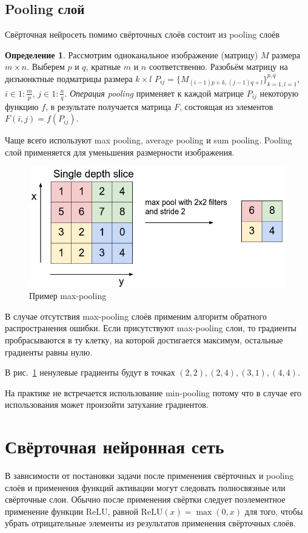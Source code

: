 \documentclass{article}
\theoremstyle{definition}
\newtheorem{definition}{Определение}
\theoremstyle{theorem}
\theoremstyle{remark}
\theoremstyle{theorem}
\theoremstyle{example}
\theoremstyle{theorem}
\theoremstyle{theorem}
\theoremstyle{theorem}
\theoremstyle{theorem}
\begin{document}
	 \subsection{ Pooling слой}
	 	Свёрточная нейросеть помимо свёрточных слоёв состоит из pooling слоёв
	 	\begin{definition}
	 		Рассмотрим одноканальное изображение (матрицу)  $M$ размера $m\times n$. Выберем $p$ и $q$, кратные $m$ и $n$ соответственно. Разобьём матрицу на дизъюнктные подматрицы размера $k\times l$ $P_{ij}=\{M_{(i-1)p+k,(j-1)q+l}\}_{k=1,l=1}^{p,q}$, $i\in1:\frac mp$, $j\in1:\frac nq$. \textit{Операция pooling} применяет к каждой матрице $P_{ij}$ некоторую функцию $f$, в результате получается матрица $F$, состоящая из элементов $F(i,j)=f(P_{ij})$.
	 	\end{definition}
	 	
	 	Чаще всего используют max pooling, average pooling и sum pooling.
	 		Pooling слой применяется для уменьшения размерности изображения.
	 	\begin{figure}[ht!]\label{pool}
	 		\includegraphics[width=\textwidth]{img/maxpool.jpeg}\caption{Пример max-pooling}
	 	\end{figure}
	 В случае отсутствия max-pooling слоёв применим алгоритм обратного распространения ошибки. Если присутствуют max-pooling слои, то градиенты пробрасываются в ту клетку, на которой достигается максимум, остальные градиенты равны нулю.
	
	В рис.~\ref{pool} ненулевые градиенты будут в точках $(2,2), (2,4), (3,1), (4,4)$.
	
	На практике не встречается использование min-pooling потому что в случае его использования может произойти затухание градиентов.
	
	\section{Свёрточная нейронная сеть}
		В зависимости от постановки задачи после применения свёрточных и pooling слоёв и применения функций активации могут следовать полносвязные или свёрточные  слои. Обычно после применения свёртки следует поэлементное применение функции $\mathrm{ReLU}$, равной $\mathrm{ReLU}(x)=\max(0,x)$ для того, чтобы убрать отрицательные элементы из результатов применения свёрточных слоёв. 
		
\end{document}
